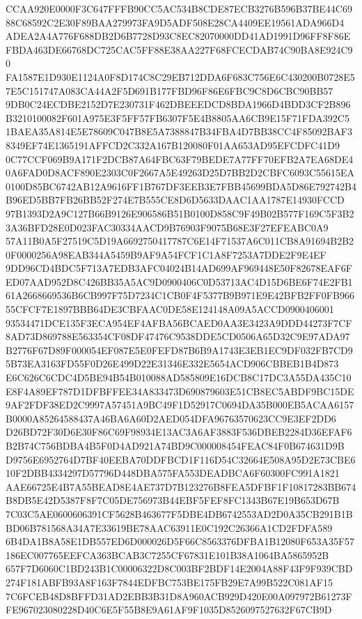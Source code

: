 \documentclass[UTF8,fontset=fandol,zihao=-4,a4paper]{ctexart}
\begin{document}
{{CCAA920E0000F3C647FFFB90CC5AC534B8CDE87ECB3276B596B37BE44C6988C68592C2E30F89BAA279973FA9D5ADF508E28CA4409EE19561ADA966D4
ADEA2A4A776F688DB2D6B7728D93C8EC82070000DD41AD1991D96FF8F86EFBDA463DE66768DC725CAC5FF88E38AA227F68FCECDAB74C90BA8E924C90
FA1587E1D930E1124A0F8D174C8C29EB712DDA6F683C756E6C430200B0728E57E5C151747A083CA44A2F5D691B177FBD96F86E6FBC9C8D6CBC90BB57
9DB0C24ECDBE2152D7E230731F462DBEEEDCD8BDA1966D4BDD3CF2B896B3210100082F601A975E3F5FF57FB6307F5E4B8805AA6CB9E15F71FDA392C5
1BAEA35A814E5E78609C047B8E5A7388847B34FBA4D7BB38CC4F85092BAF38349EF74E1365191AFFCD2C332A167B120080F01AA653AD95EFCDFC41D9
0C77CCF069B9A171F2DCB87A64FBC63F79BEDE7A77FF70EFB2A7EA68DE40A6FAD0D8ACF890E2303C0F2667A5E49263D25D7BB2D2CBFC6093C55615EA
0100D85BC6742AB12A9616FF1B767DF3EEB3E7FBB45699BDA5D86E792742B4B96ED5BB7FB26BB52F274E7B555CE8D6D5633DAAC1AA1787E14930FCCD
97B1393D2A9C127B66B9126E906586B51B0100D858C9F49B02B577F169C5F3B23A36BFD28E0D023FAC30334AACD9B76903F9075B68E3F27EFEABC0A9
57A11B0A5F27519C5D19A6692750417787C6E14F71537A6C011CB8A91694B2B20F0000256A98EAB344A5459B9AF9A54FCF1C1A8F7253A7DDE2F9E4EF
9DD96CD4BDC5F713A7EDB3AFC04024B14AD699AF969448E50F82678EAF6FED07AAD952D8C426BB35A5AC9D0900406C0D53713AC4D15D6BE6F74E2FB1
61A2668669536B6CB997F75D7234C1CB0F4F5377B9B971E9E42BFB2FF0FB96655CFCF7E1897BBB64DE3CBFAAC0DE58E124148A09A5ACCD0900406001
93534471DCE135F3ECA954EF4AFBA56BCAED0AA3E3423A9DDD44273F7CF8AD73D869788E563354CF08DF47476C9538DDE5CD0506A65D32C9E97ADA97
B2776F67D89F000054EF087E5E0FEFD87B6B9A1743E3EB1EC9DF032FB7CD95B73EA3163FD55F0D26E499D22E31346E332E5654ACD906CBBEB1B4D873
E6C626C6CDC4D5BE94B54B010088AD585809E16DCB8C17DC3A55DA435C10E8F4A89EF787D1DFBFFEE34A833473D690879603E51CB8EC5ABDF9BC15DE
9AF2FDF38ED2C9997A57451A9BC49F1D52917C0694DA35B000EB5ACAA6157B0000A85264588437A46BA6A60D2AED054DFA96763570623CC9E3EF2DD6
D26BD72F30D6E30F86C69F98934E13AC3A6AF3883F536DBEB2284D36EFAF6B2B74C756BDBA4B5F0D4AD921A74BD9C000008454FEAC84F0B674631D9B
D9756E6952764D7BF40EEBA70DDFBCD1F116D54C32664E508A95D2E73CBE610F2DBB4334297D57796D448DBA575FA553DEADBCA6F60300FC991A1821
AAE66725E4B7A55BEAD8E4AE737D7B123276B8FEA5DFBF1F10817283BB674B8DB5E42D5387F8F7C05DE756973B44EBF5FEF8FC1343B67E19B653D67B
7C03C5AE0600606391CF5628B463677F5DBE4DB6742553AD2D0A35CB291B1BBD06B781568A34A7E33619BE78AAC63911E0C192C26366A1CD2FDFA589
6B4DA1B8A58E1DB557ED6D000026D5F66C8563376DFBA1B12080F653A35F57186EC007765EEFCA363BCAB3C7255CF67831E101B38A1064BA5865952B
657F7D6060C1BD243B1C00006322D8C003BF2BDF14E2004A88F43F9F939CBD274F181ABFB93A8F163F7844EDFBC753BE175FB29E7A99B522C081AF15
7C6FCEB48D8BFFD31AD2EBB3B31D8A960ACB929D420E00A097972B61273FFE967023080228D40C6E5F55B8E9A61AF9F1035D8526097527632F67CB9D
}}
\end{document}
